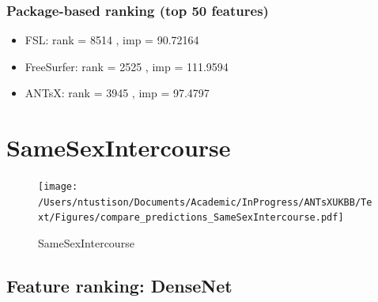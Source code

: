 \documentclass[
  10pt,
]{article}
\begin{document}
\hypertarget{package-based-ranking-top-50-features-8}{%
\subsubsection{Package-based ranking (top 50
features)}\label{package-based-ranking-top-50-features-8}}

\begin{itemize}
\item
  FSL: rank = 8514 , imp = 90.72164
\item
  FreeSurfer: rank = 2525 , imp = 111.9594
\item
  ANTsX: rank = 3945 , imp = 97.4797
\end{itemize}

\clearpage

\hypertarget{samesexintercourse}{%
\section{SameSexIntercourse}\label{samesexintercourse}}

\begin{figure}
\centering
\texttt{[image: /Users/ntustison/Documents/Academic/InProgress/ANTsXUKBB/Text/Figures/compare\_predictions\_SameSexIntercourse.pdf]}
\caption{SameSexIntercourse}
\end{figure}

\hypertarget{feature-ranking-densenet}{%
\subsection{Feature ranking: DenseNet}\label{feature-ranking-densenet}}
\end{document}
